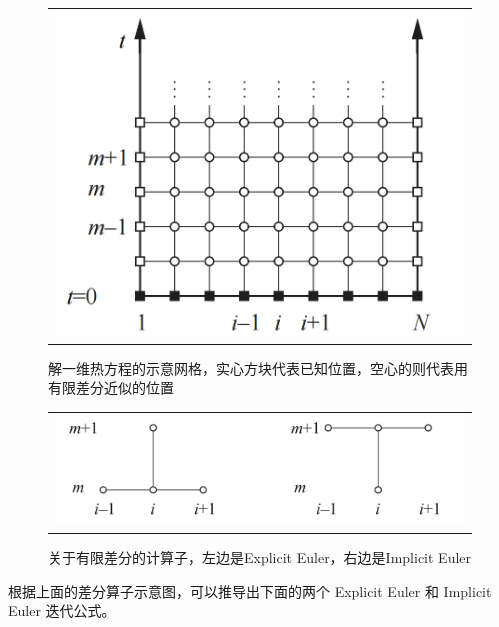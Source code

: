 \documentclass[3p]{elsarticle}
\numberwithin{equation}{section}
\begin{document}
    \begin{figure}[h]
	\begin{center}
		\begin{tabular}{c}
			\includegraphics[angle=0, clip=true, scale=0.25]{./figures/mesh.png}
		\end{tabular}
	\end{center}
	\caption{解一维热方程的示意网格，实心方块代表已知位置，空心的则代表用有限差分近似的位置}
	\label{fig:illustration-mesh}
    \end{figure}
    
    
    \begin{figure}[h]
    	\begin{center}
    		\begin{tabular}{c}
    			\includegraphics[angle=0, clip=true, scale=0.25]{./figures/compute_molecules.png}
    		\end{tabular}
    	\end{center}
    	\caption{关于有限差分的计算子，左边是Explicit Euler，右边是Implicit Euler}
    	\label{fig:illustration-molecules}
    \end{figure}

    根据上面的差分算子示意图，可以推导出下面的两个 Explicit Euler 和 Implicit Euler 迭代公式。
        
\end{document}
